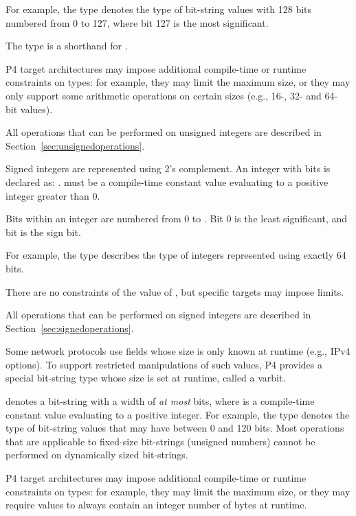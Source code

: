 \documentclass[12pt]{article}
\begin{document}
For example, the type  denotes the type of bit-string
values with 128 bits numbered from 0 to 127, where bit 127 is the most
significant.

The type  is a shorthand for .

P4 target architectures may impose additional compile-time or runtime
constraints on  types: for example, they may limit the
maximum size, or they may only support some arithmetic operations on
certain sizes (e.g., 16-, 32- and 64- bit values).

All operations that can be performed on unsigned integers are
described in Section~\ref{sec:unsignedoperations}.


Signed integers are represented using 2's complement.  An integer with
\W{} bits is declared as: \Int{\W}.  \W{} must be a compile-time
constant value evaluating to a positive integer greater than 0.

Bits within an integer are numbered from 0 to . Bit 0 is the least
significant, and bit  is the sign bit.

For example, the type  describes the type of integers
represented using exactly 64 bits.

There are no constraints of the value of \W, but specific targets may
impose limits.

All operations that can be performed on signed integers are
described in Section~\ref{sec:signedoperations}.


Some network protocols use fields whose size is only known at runtime
(e.g., IPv4 options). To support restricted manipulations of such
values, P4 provides a special bit-string type whose size is set at
runtime, called a varbit.

 denotes a bit-string with a width of
\emph{at most} \W{} bits, where \W{} is a compile-time constant value
evaluating to a positive integer.  For example, the type
 denotes the type of bit-string values that
may have between 0 and 120 bits.  Most operations that are applicable
to fixed-size bit-strings (unsigned numbers) cannot be performed on
dynamically sized bit-strings.

P4 target architectures may impose additional compile-time or runtime
constraints on  types: for example, they may limit the
maximum size, or they may require  values to always
contain an integer number of bytes at runtime.
\end{document}

